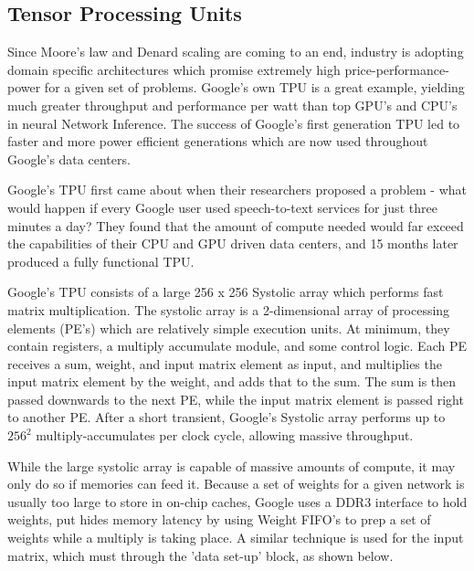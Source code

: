 \documentclass[11pt, conference, onecolumn]{IEEEtran}
\begin{document}
\subsection{Tensor Processing Units}
    Since Moore's law and Denard scaling are coming to an end, industry is adopting
    domain specific architectures which promise extremely high price-performance-power for
    a given set of problems. Google's own TPU is a great example, yielding much greater
    throughput and performance per watt than top GPU's and CPU's in neural Network
    Inference. The success of Google's first generation TPU led to faster and more power
    efficient generations which are now used throughout Google's data centers.

    Google's TPU first came about when their researchers proposed a problem - what
    would happen if every Google user used speech-to-text services for just three minutes
    a day? They found that the amount of compute needed would far exceed the capabilities
    of their CPU and GPU driven data centers, and 15 months later produced a fully
    functional TPU.

    Google's TPU consists of a large 256 x 256 Systolic array which performs fast matrix
    multiplication. The systolic array is a 2-dimensional array of processing elements
    (PE's) which are relatively simple execution units. At minimum, they contain
    registers, a multiply accumulate module, and some control logic. Each PE receives a
    sum, weight, and input matrix element as input, and multiplies the input matrix
    element by the weight, and adds that to the sum. The sum is then passed downwards
    to the next PE, while the input matrix element is passed right to another PE. After
    a short transient, Google's Systolic array performs up to $256^2$ multiply-accumulates
    per clock cycle, allowing massive throughput.

    While the large systolic array is capable of massive amounts of compute, it may only
    do so if memories can feed it. Because a set of weights for a given network is usually
    too large to store in on-chip caches, Google uses a DDR3 interface to hold weights,
    put hides memory latency by using Weight FIFO's to prep a set of weights while a
    multiply is taking place. A similar technique is used for the input matrix, which must
    through the 'data set-up' block, as shown below.
\end{document}
